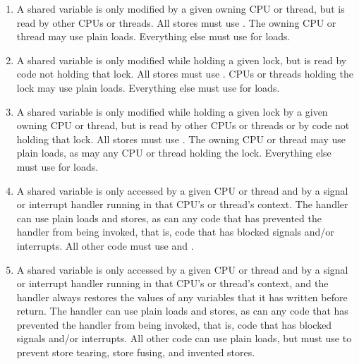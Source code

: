 \begin{enumerate}
\item	A shared variable is only modified by a given owning CPU or
	thread, but is read by other CPUs or threads.
	All stores must use .
	The owning CPU or thread may use plain loads.
	Everything else must use  for loads.
\item	A shared variable is only modified while holding a given
	lock, but is read by code not holding that lock.
	All stores must use .
	CPUs or threads holding the lock may use plain loads.
	Everything else must use  for loads.
\item	A shared variable is only modified while holding a given
	lock by a given owning CPU or thread, but is read by other
	CPUs or threads or by code not holding that lock.
	All stores must use .
	The owning CPU or thread may use plain loads, as may any
	CPU or thread holding the lock.
	Everything else must use  for loads.
\item	A shared variable is only accessed by a given CPU or thread
	and by a signal or interrupt handler running in that CPU's
	or thread's context.
	The handler can use plain loads and stores, as can any code
	that has prevented the handler from being invoked, that is,
	code that has blocked signals and/or interrupts.
	All other code must use  and .
\item	A shared variable is only accessed by a given CPU or thread
	and by a signal or interrupt handler running in that CPU's
	or thread's context, and the handler always restores the values of any
	variables that it has written before return.
	The handler can use plain loads and stores, as can any code
	that has prevented the handler from being invoked, that is,
	code that has blocked signals and/or interrupts.
	All other code can use plain loads, but must use 
	to prevent store tearing, store fusing, and invented stores.
\end{enumerate}

\QuickQuizEnd

